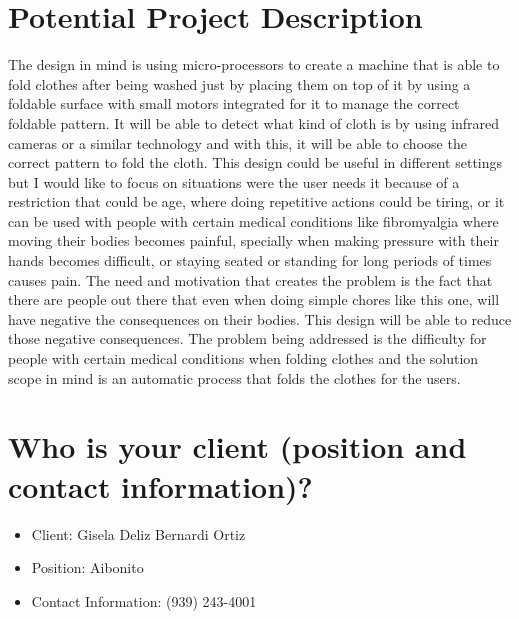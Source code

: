 \documentclass[12pt]{article}
\begin{document}
\section{Potential Project Description}

The design in mind is using micro-processors to create a machine that is able to fold clothes after being washed just by placing them on top of it by using a foldable surface with small motors integrated for it to manage the correct foldable pattern. It will be able to detect what kind of cloth is by using infrared cameras or a similar technology and with this, it will be able to choose the correct pattern to fold the cloth.  This design could be useful in different settings but I would like to focus on situations were the user needs it because of a restriction that could be age, where doing repetitive actions could be tiring, or it can be used with people with certain medical conditions like fibromyalgia where moving their bodies becomes painful, specially when making pressure with their hands becomes difficult, or staying seated or standing for long periods of times causes pain. The need  and motivation that creates the problem is the fact that there are people out there that even when doing simple chores like this one, will have negative the consequences on their bodies. This design will be able to reduce those negative consequences. The problem being addressed is the difficulty for people with certain medical conditions when folding clothes and the solution scope in mind is an automatic process that folds the clothes for the users.


\newpage
\section{Who is your client (position and contact information)?}
\begin{itemize}
\item Client: Gisela Deliz Bernardi Ortiz
\item Position: Aibonito
\item Contact Information: (939) 243-4001
\end{itemize}
\end{document}
